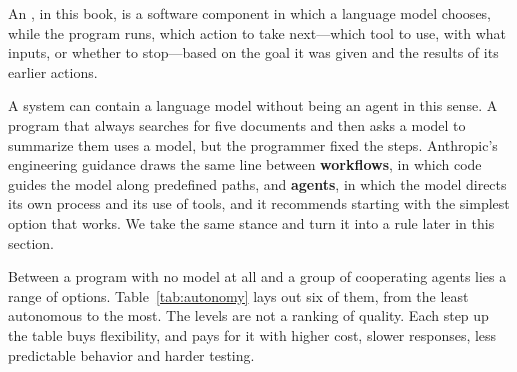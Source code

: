 \begin{definition}
An , in this book, is a software component in which a language model chooses, while the program runs, which action to take next---which tool to use, with what inputs, or whether to stop---based on the goal it was given and the results of its earlier actions.
\end{definition}

A system can contain a language model without being an agent in this sense. A program that always searches for five documents and then asks a model to summarize them uses a model, but the programmer fixed the steps. Anthropic's engineering guidance draws the same line between \textbf{workflows}, in which code guides the model along predefined paths, and \textbf{agents}, in which the model directs its own process and its use of tools, and it recommends starting with the simplest option that works. We take the same stance and turn it into a rule later in this section.

Between a program with no model at all and a group of cooperating agents lies a range of options. Table~\ref{tab:autonomy} lays out six of them, from the least autonomous to the most. The levels are not a ranking of quality. Each step up the table buys flexibility, and pays for it with higher cost, slower responses, less predictable behavior and harder testing.

